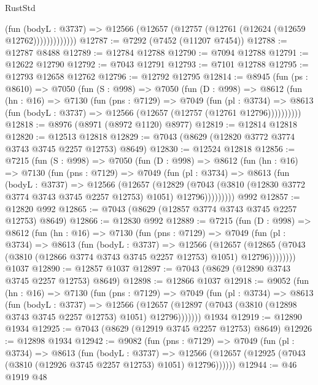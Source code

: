\begin{lexlean}{RustStd}
\begin{coremodule}
                  (fun (bodyL : @3737) =>
                  @12566 (@12657 (@12757 (@12761 (@12624 (@12659 @12762)))))))))))))
@12787 := @7292 (@7452 (@11207 @7454))
@12788 := @12787 @8488
@12789 := @12784 @12788
@12790 := @7094 @12788
@12791 := @12622 @12790
@12792 := @7043 @12791
@12793 := @7101 @12788
@12795 := @12793 @12658 @12762
@12796 := @12792 @12795
@12814 := @8945
    (fun (ps : @8610) =>
    @7050
      (fun (S : @998) =>
      @7050
        (fun (D : @998) =>
        @8612
          (fun (hn : @16) =>
          @7130
            (fun (pns : @7129) =>
            @7049
              (fun (pl : @3734) =>
              @8613 (fun (bodyL : @3737) => @12566 (@12657 (@12757 (@12761 @12796))))))))))
@12818 := @8976 (@8971 (@8972 @1120) @8977)
@12819 := @12814 @12818
@12820 := @12513 @12818
@12829 := @7043 (@8629 (@12820 @3772 @3774 @3743 @3745 @2257 @12753) @8649)
@12830 := @12524 @12818
@12856 := @7215
    (fun (S : @998) =>
    @7050
      (fun (D : @998) =>
      @8612
        (fun (hn : @16) =>
        @7130
          (fun (pns : @7129) =>
          @7049
            (fun (pl : @3734) =>
            @8613
              (fun (bodyL : @3737) =>
              @12566
                (@12657
                  (@12829
                    (@7043
                      (@3810 (@12830 @3772 @3774 @3743 @3745 @2257 @12753) @1051)
                      @12796)))))))))
    @992
@12857 := @12820 @992
@12865 := @7043 (@8629 (@12857 @3774 @3743 @3745 @2257 @12753) @8649)
@12866 := @12830 @992
@12889 := @7215
    (fun (D : @998) =>
    @8612
      (fun (hn : @16) =>
      @7130
        (fun (pns : @7129) =>
        @7049
          (fun (pl : @3734) =>
          @8613
            (fun (bodyL : @3737) =>
            @12566
              (@12657
                (@12865 (@7043 (@3810 (@12866 @3774 @3743 @3745 @2257 @12753) @1051) @12796))))))))
    @1037
@12890 := @12857 @1037
@12897 := @7043 (@8629 (@12890 @3743 @3745 @2257 @12753) @8649)
@12898 := @12866 @1037
@12918 := @9052
    (fun (hn : @16) =>
    @7130
      (fun (pns : @7129) =>
      @7049
        (fun (pl : @3734) =>
        @8613
          (fun (bodyL : @3737) =>
          @12566
            (@12657 (@12897 (@7043 (@3810 (@12898 @3743 @3745 @2257 @12753) @1051) @12796)))))))
    @1934
@12919 := @12890 @1934
@12925 := @7043 (@8629 (@12919 @3745 @2257 @12753) @8649)
@12926 := @12898 @1934
@12942 := @9082
    (fun (pns : @7129) =>
    @7049
      (fun (pl : @3734) =>
      @8613
        (fun (bodyL : @3737) =>
        @12566 (@12657 (@12925 (@7043 (@3810 (@12926 @3745 @2257 @12753) @1051) @12796))))))
@12944 := @46 @1919 @48

\end{coremodule}
\end{lexlean}
